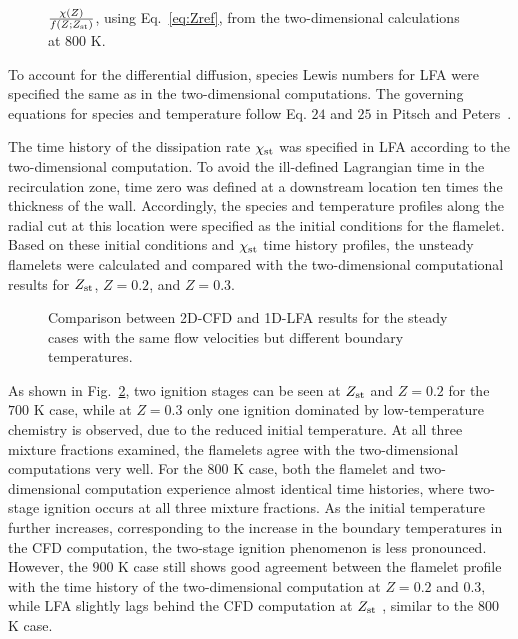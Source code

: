 \begin{figure}
  \centering
  \scriptsize
  
  \normalsize
  \caption{$\frac{\chi(Z)}{f(Z;Z_{\rm st})}$, using Eq.~\ref{eq:Zref}, from the two-dimensional calculations at $800$ K.}
  \label{fig:Zref}
\end{figure}

To account for the differential diffusion, species Lewis numbers for LFA  were specified the same as in the two-dimensional computations.  The governing equations for species and temperature follow Eq. $24$ and $25$ in Pitsch and Peters~\cite{pitsch98b}.

The time history of the dissipation rate $\chi_{\rm st}$ was specified in LFA according to the two-dimensional computation.  To avoid the ill-defined Lagrangian time in the recirculation zone, time zero was defined at a downstream location ten times the thickness of the wall.  Accordingly, the species and temperature profiles along the radial cut at this location were specified as the initial conditions for the flamelet.  Based on these initial conditions and $\chi_{\rm st}$ time history profiles, the unsteady flamelets were calculated and compared with the two-dimensional computational results for $Z_{\rm st}$, $Z = 0.2$, and $Z = 0.3$.

\begin{figure}
  \centering
  \scriptsize
  \resizebox{1.15\textwidth}{!}{}
  \normalsize
  \caption{Comparison between 2D-CFD and 1D-LFA results for the steady cases with the same flow velocities but different boundary temperatures.}
  \label{fig:LFA_T}
\end{figure}

As shown in Fig.~\ref{fig:LFA_T}, two ignition stages can be seen at $Z_{\rm st}$ and $Z = 0.2$ for the $700$ K case, while at $Z = 0.3$ only one ignition dominated by low-temperature chemistry is observed, due to the reduced initial temperature.   At all three mixture fractions examined, the flamelets agree with the two-dimensional computations very well.  For the $800$ K case, both the flamelet and two-dimensional computation experience almost identical time histories, where two-stage ignition occurs at all three mixture fractions.  As the initial temperature further increases, corresponding to the increase in the boundary temperatures in the CFD computation, the two-stage ignition phenomenon is less pronounced.  However, the $900$ K case still shows good agreement between the flamelet profile with the time history of the two-dimensional computation at $Z = 0.2$ and $0.3$, while LFA slightly lags behind the CFD computation at $Z_{\rm st}$ , similar to the $800$ K case.

